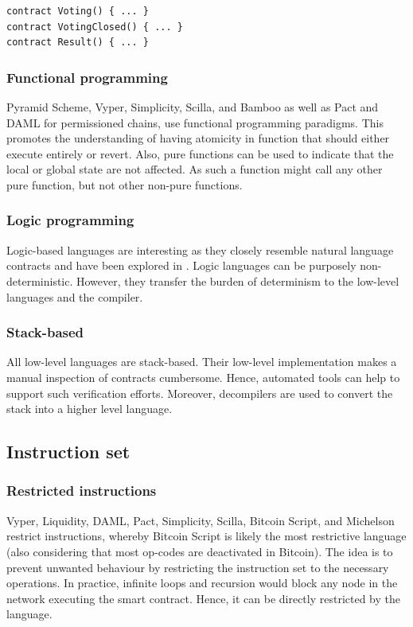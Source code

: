 \begin{lstlisting}[caption={A separation of states represented in Bamboo, where each state represents a different contract at the same address.},label=lst:fsm,language=Solidity]
contract Voting() { ... }
contract VotingClosed() { ... }
contract Result() { ... }
\end{lstlisting}

\subsubsection{Functional programming}
Pyramid Scheme, Vyper, Simplicity, Scilla, and Bamboo as well as Pact and DAML for permissioned chains, use functional programming paradigms. This promotes the understanding of having atomicity in function that should either execute entirely or revert. Also, pure functions can be used to indicate that the local or global state are not affected. As such a function might call any other pure function, but not other non-pure functions.

\subsubsection{Logic programming}
Logic-based languages are interesting as they closely resemble natural language contracts and have been explored in \cite{Idelberger2016}. Logic languages can be purposely non-deterministic. However, they transfer the burden of determinism to the low-level languages and the compiler.


\subsubsection{Stack-based}
All low-level languages are stack-based. Their low-level implementation makes a manual inspection of contracts cumbersome. Hence, automated tools can help to support such verification efforts. Moreover, decompilers are used to convert the stack into a higher level language.

\subsection{Instruction set}
\subsubsection{Restricted instructions}
Vyper, Liquidity, DAML, Pact, Simplicity, Scilla, Bitcoin Script, and Michelson restrict instructions, whereby Bitcoin Script is likely the most restrictive language (also considering that most op-codes are deactivated in Bitcoin). 
The idea is to prevent unwanted behaviour by restricting the instruction set to the necessary operations.
In practice, infinite loops and recursion would block any node in the network executing the smart contract. Hence, it can be directly restricted by the language.

